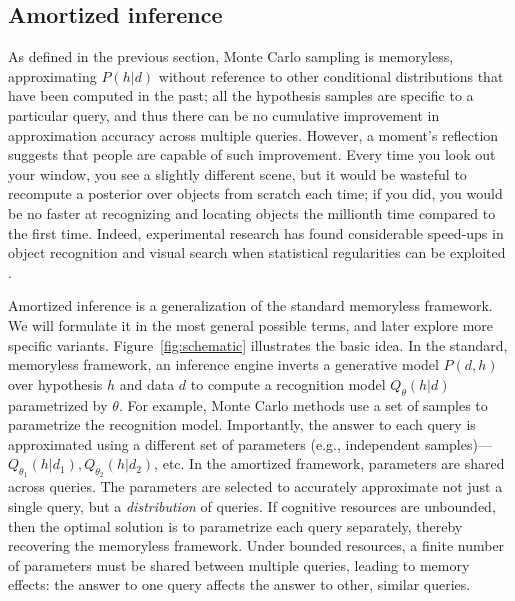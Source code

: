 \subsection{Amortized inference}

As defined in the previous section, Monte Carlo sampling is memoryless, approximating $P(h|d)$ without reference to other conditional distributions that have been computed in the past; all the hypothesis samples are specific to a particular query, and thus there can be no cumulative improvement in approximation accuracy across multiple queries. However, a moment's reflection suggests that people are capable of such improvement. Every time you look out your window, you see a slightly different scene, but it would be wasteful to recompute a posterior over objects from scratch each time; if you did, you would be no faster at recognizing and locating objects the millionth time compared to the first time. Indeed, experimental research has found considerable speed-ups in object recognition and visual search when statistical regularities can be exploited \citep{oliva2007role}.

Amortized inference is a generalization of the standard memoryless framework. We will formulate it in the most general possible terms, and later explore more specific variants. Figure~\ref{fig:schematic} illustrates the basic idea. In the standard, memoryless framework, an inference engine inverts a generative model $P(d,h)$ over hypothesis $h$ and data $d$ to compute a recognition model $Q_\theta(h|d)$ parametrized by $\theta$. For example, Monte Carlo methods use a set of samples to parametrize the recognition model. Importantly, the answer to each query is approximated using a different set of parameters (e.g., independent samples)---$Q_{\theta_1}(h|d_1), Q_{\theta_2}(h|d_2)$, etc. In the amortized framework, parameters are shared across queries. The parameters are selected to accurately approximate not just a single query, but a \emph{distribution} of queries. If cognitive resources are unbounded, then the optimal solution is to parametrize each query separately, thereby recovering the memoryless framework. Under bounded resources, a finite number of parameters must be shared between multiple queries, leading to memory effects: the answer to one query affects the answer to other, similar queries.

